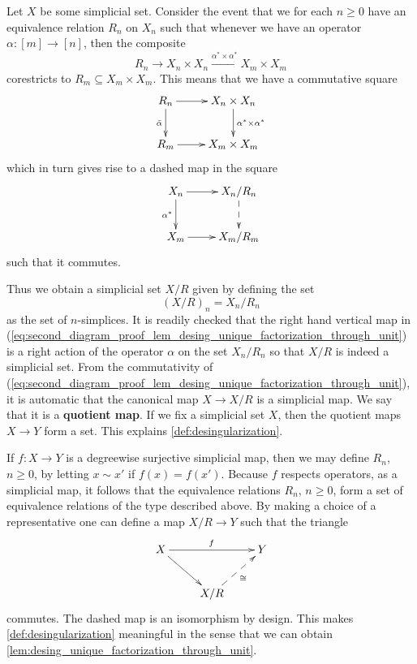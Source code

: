 Let $X$ be some simplicial set. Consider the event that we for each $n\geq 0$ have an equivalence relation $R_n$ on $X_n$ such that whenever we have an operator $\alpha :[m]\to [n]$, then the composite
\[R_n\to X_n\times X_n\xrightarrow{\alpha ^*\times \alpha ^*} X_m\times X_m\]
corestricts to $R_m\subseteq X_m\times X_m$. This means that we have a commutative square
\begin{equation}
\label{eq:first_diagram_proof_lem_desing_unique_factorization_through_unit}
\begin{gathered}
\xymatrix{
R_n \ar[d]_{\bar{\alpha } } \ar[r] & X_n\times X_n \ar[d]^{\alpha ^*\times \alpha ^*} \\
R_m \ar[r] & X_m\times X_m
}
\end{gathered}
\end{equation}
which in turn gives rise to a dashed map in the square
\begin{equation}
\label{eq:second_diagram_proof_lem_desing_unique_factorization_through_unit}
\begin{gathered}
\xymatrix{
X_n \ar[d]_{\alpha ^*} \ar[r] & X_n/R_n \ar@{-->}[d] \\
X_m \ar[r] & X_m/R_m
}
\end{gathered}
\end{equation}
such that it commutes.

Thus we obtain a simplicial set $X/R$ given by defining the set
\[(X/R)_n=X_n/R_n\]
as the set of $n$-simplices. It is readily checked that the right hand vertical map in (\ref{eq:second_diagram_proof_lem_desing_unique_factorization_through_unit}) is a right action of the operator $\alpha$ on the set $X_n/R_n$ so that $X/R$ is indeed a simplicial set. From the commutativity of (\ref{eq:second_diagram_proof_lem_desing_unique_factorization_through_unit}), it is automatic that the canonical map $X\to X/R$ is a simplicial map. We say that it is a \textbf{quotient map}. If we fix a simplicial set $X$, then the quotient maps $X\to Y$ form a set. This explains \cref{def:desingularization}.

If $f:X\to Y$ is a degreewise surjective simplicial map, then we may define $R_n$, $n\geq 0$, by letting $x\sim x'$ if $f(x)=f(x')$. Because $f$ respects operators, as a simplicial map, it follows that the equivalence relations $R_n$, $n\geq 0$, form a set of equivalence relations of the type described above. By making a choice of a representative one can define a map $X/R\to Y$ such that the triangle
\begin{equation}
\label{eq:third_diagram_proof_lem_desing_unique_factorization_through_unit}
\begin{gathered}
\xymatrix{
X \ar[dr] \ar[rr]^f && Y \\
& X/R \ar@{-->}[ur]_\cong
}
\end{gathered}
\end{equation}
commutes. The dashed map is an isomorphism by design. This makes \cref{def:desingularization} meaningful in the sense that we can obtain \cref{lem:desing_unique_factorization_through_unit}. 

